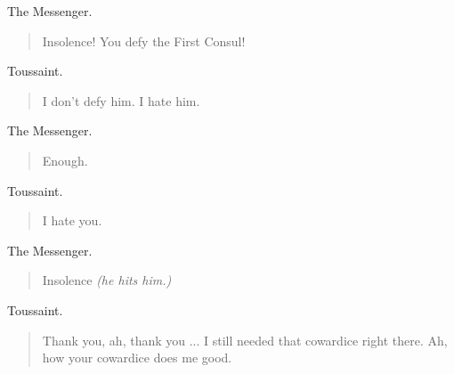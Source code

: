 \documentclass[letterpaper,article,12pt,oneside,notitlepage]{memoir}
\begin{document}
\begin{center}The Messenger.\end{center}

\begin{verse}
\hspace{1cm} Insolence! You defy the First Consul! \\
\end{verse}

\begin{center}Toussaint.\end{center}

\begin{verse}
\hspace{1cm} I don't defy him. I hate him. \\
\end{verse}

\begin{center}The Messenger.\end{center}

\begin{verse}
\hspace{1cm} Enough. \\
\end{verse}

\begin{center}Toussaint.\end{center}

\begin{verse}
\hspace{1cm} I hate you. \\
\end{verse}

\begin{center}The Messenger.\end{center}

\begin{verse}
\hspace{1cm} Insolence \textit{(he hits him.)} \\
\end{verse}

\begin{center}Toussaint.\end{center}

\begin{verse}
\indent Thank you, ah, thank you ... I still needed that cowardice right there. Ah, how your cowardice does me good. \\
\end{verse}
\end{document}
